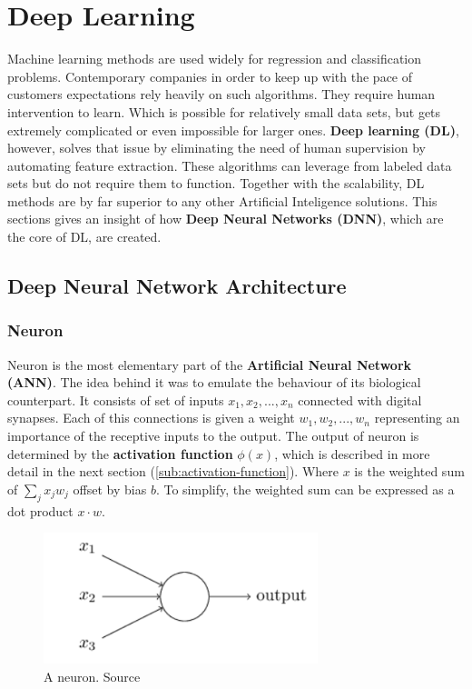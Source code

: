 \chapter{Deep Learning}
\label{cha:dl}

Machine learning methods are used widely for regression and classification problems. Contemporary companies in order to keep up with the pace of customers expectations rely heavily on such algorithms. They require human intervention to learn. Which is possible for relatively small data sets, but gets extremely complicated or even impossible for larger ones. \textbf{Deep learning (DL)}, however, solves that issue by eliminating the need of human supervision by automating feature extraction. These algorithms can leverage from labeled data sets but do not require them to function. Together with the scalability, DL methods are by far superior to any other Artificial Inteligence solutions. This sections gives an insight of how \textbf{Deep Neural Networks (DNN)}, which are the core of DL, are created.


\section{Deep Neural Network Architecture}
\label{sec:dnn-arch}

\subsection{Neuron}
\label{sub:neuron}

Neuron is the most elementary part of the \textbf{Artificial Neural Network (ANN)}. The idea behind it was to emulate the behaviour of its biological counterpart. It consists of set of inputs $x_1, x_2, ..., x_n$ connected with digital synapses. Each of this connections is given a weight $w_1, w_2, ..., w_n$ representing an importance of the receptive inputs to the output. The output of neuron is determined by the \textbf{activation function} $\phi(x)$, which is described in more detail in the next section (\ref{sub:activation-function}). Where $x$ is the weighted sum of $\sum_j {x_j}{w_j}$ offset by bias $b$. To simplify, the weighted sum can be expressed as a dot product $x \cdot w$.

\begin{figure}[h]
    \centering
    \includegraphics[width=8cm]{img/Perceptron.png}
    \caption{A neuron. Source \cite{NNandDL}}
    \label{fig:neuron}
\end{figure}

